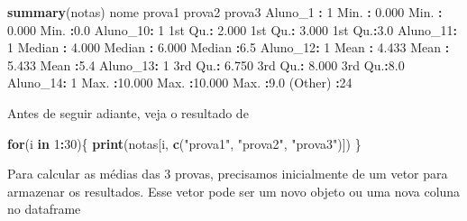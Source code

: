 \documentclass[10pt,a4paper]{book}
\newenvironment{Shaded}{\begin{snugshade}}{\end{snugshade}}
\newcommand{\KeywordTok}[1]{\textcolor[rgb]{0.13,0.29,0.53}{\textbf{#1}}}
\newcommand{\DecValTok}[1]{\textcolor[rgb]{0.00,0.00,0.81}{#1}}
\newcommand{\FloatTok}[1]{\textcolor[rgb]{0.00,0.00,0.81}{#1}}
\newcommand{\StringTok}[1]{\textcolor[rgb]{0.31,0.60,0.02}{#1}}
\newcommand{\ControlFlowTok}[1]{\textcolor[rgb]{0.13,0.29,0.53}{\textbf{#1}}}
\newcommand{\OperatorTok}[1]{\textcolor[rgb]{0.81,0.36,0.00}{\textbf{#1}}}
\newcommand{\NormalTok}[1]{#1}
\begin{document}
\begin{Shaded}
\begin{Highlighting}[]
\KeywordTok{summary}\NormalTok{(notas)}
\NormalTok{       nome        prova1           prova2           prova3   }
\NormalTok{ Aluno_}\DecValTok{1} \OperatorTok{:}\StringTok{ }\DecValTok{1}\NormalTok{   Min.   }\OperatorTok{:}\StringTok{ }\FloatTok{0.000}\NormalTok{   Min.   }\OperatorTok{:}\StringTok{ }\FloatTok{0.000}\NormalTok{   Min.   }\OperatorTok{:}\FloatTok{0.0}  
\NormalTok{ Aluno_}\DecValTok{10}\OperatorTok{:}\StringTok{ }\DecValTok{1}\NormalTok{   1st Qu.}\OperatorTok{:}\StringTok{ }\FloatTok{2.000}\NormalTok{   1st Qu.}\OperatorTok{:}\StringTok{ }\FloatTok{3.000}\NormalTok{   1st Qu.}\OperatorTok{:}\FloatTok{3.0}  
\NormalTok{ Aluno_}\DecValTok{11}\OperatorTok{:}\StringTok{ }\DecValTok{1}\NormalTok{   Median }\OperatorTok{:}\StringTok{ }\FloatTok{4.000}\NormalTok{   Median }\OperatorTok{:}\StringTok{ }\FloatTok{6.000}\NormalTok{   Median }\OperatorTok{:}\FloatTok{6.5}  
\NormalTok{ Aluno_}\DecValTok{12}\OperatorTok{:}\StringTok{ }\DecValTok{1}\NormalTok{   Mean   }\OperatorTok{:}\StringTok{ }\FloatTok{4.433}\NormalTok{   Mean   }\OperatorTok{:}\StringTok{ }\FloatTok{5.433}\NormalTok{   Mean   }\OperatorTok{:}\FloatTok{5.4}  
\NormalTok{ Aluno_}\DecValTok{13}\OperatorTok{:}\StringTok{ }\DecValTok{1}\NormalTok{   3rd Qu.}\OperatorTok{:}\StringTok{ }\FloatTok{6.750}\NormalTok{   3rd Qu.}\OperatorTok{:}\StringTok{ }\FloatTok{8.000}\NormalTok{   3rd Qu.}\OperatorTok{:}\FloatTok{8.0}  
\NormalTok{ Aluno_}\DecValTok{14}\OperatorTok{:}\StringTok{ }\DecValTok{1}\NormalTok{   Max.   }\OperatorTok{:}\FloatTok{10.000}\NormalTok{   Max.   }\OperatorTok{:}\FloatTok{10.000}\NormalTok{   Max.   }\OperatorTok{:}\FloatTok{9.0}  
\NormalTok{ (Other) }\OperatorTok{:}\DecValTok{24}                                                  
\end{Highlighting}
\end{Shaded}

Antes de seguir adiante, veja o resultado de

\begin{Shaded}
\begin{Highlighting}[]
\ControlFlowTok{for}\NormalTok{(i }\ControlFlowTok{in} \DecValTok{1}\OperatorTok{:}\DecValTok{30}\NormalTok{)\{}
    \KeywordTok{print}\NormalTok{(notas[i, }\KeywordTok{c}\NormalTok{(}\StringTok{"prova1"}\NormalTok{, }\StringTok{"prova2"}\NormalTok{, }\StringTok{"prova3"}\NormalTok{)])}
\NormalTok{\}}
\end{Highlighting}
\end{Shaded}

Para calcular as médias das 3 provas, precisamos inicialmente de um
vetor para armazenar os resultados. Esse vetor pode ser um novo objeto
ou uma nova coluna no dataframe
\end{document}
